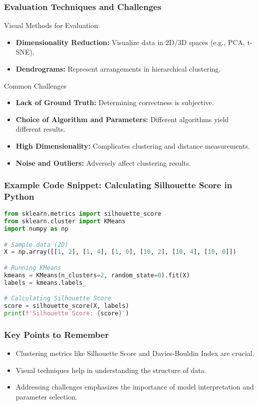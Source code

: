 \documentclass{beamer}
\begin{document}
\begin{frame}
    \frametitle{Evaluation Techniques and Challenges}
    \begin{block}{Visual Methods for Evaluation}
        \begin{itemize}
            \item \textbf{Dimensionality Reduction:} Visualize data in 2D/3D spaces (e.g., PCA, t-SNE).
            \item \textbf{Dendrograms:} Represent arrangements in hierarchical clustering.
        \end{itemize}
    \end{block}
    
    \begin{block}{Common Challenges}
        \begin{itemize}
            \item \textbf{Lack of Ground Truth:} Determining correctness is subjective.
            \item \textbf{Choice of Algorithm and Parameters:} Different algorithms yield different results.
            \item \textbf{High Dimensionality:} Complicates clustering and distance measurements.
            \item \textbf{Noise and Outliers:} Adversely affect clustering results.
        \end{itemize}
    \end{block}
\end{frame}

\begin{frame}[fragile]
    \frametitle{Example Code Snippet: Calculating Silhouette Score in Python}
    \begin{lstlisting}[language=Python]
from sklearn.metrics import silhouette_score
from sklearn.cluster import KMeans
import numpy as np

# Sample data (2D)
X = np.array([[1, 2], [1, 4], [1, 0], [10, 2], [10, 4], [10, 0]])

# Running KMeans
kmeans = KMeans(n_clusters=2, random_state=0).fit(X)
labels = kmeans.labels_

# Calculating Silhouette Score
score = silhouette_score(X, labels)
print(f'Silhouette Score: {score}')
    \end{lstlisting}
\end{frame}

\begin{frame}
    \frametitle{Key Points to Remember}
    \begin{itemize}
        \item Clustering metrics like Silhouette Score and Davies-Bouldin Index are crucial.
        \item Visual techniques help in understanding the structure of data.
        \item Addressing challenges emphasizes the importance of model interpretation and parameter selection.
    \end{itemize}
\end{frame}
\end{document}
